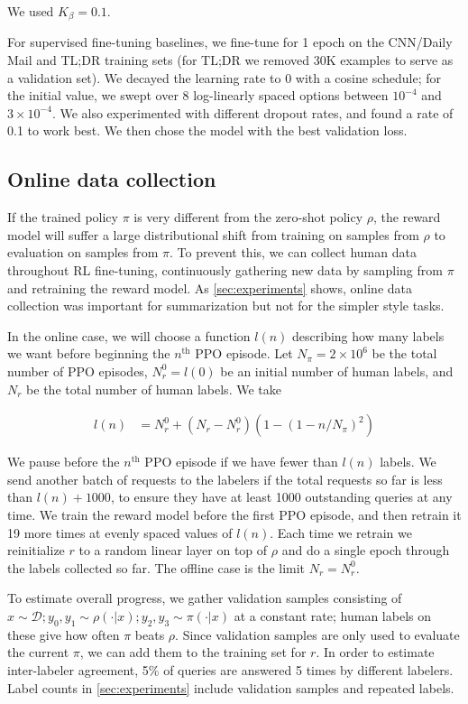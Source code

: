 We used $K_\beta = 0.1$.

For supervised fine-tuning baselines, we fine-tune for 1 epoch on the CNN/Daily Mail and TL;DR training sets (for TL;DR we removed 30K examples to serve as a validation set). We decayed the learning rate to 0 with a cosine schedule; for the initial value, we swept over 8 log-linearly spaced options between $10^{-4}$ and $3 \times 10^{-4}$. We also experimented with different dropout rates, and found a rate of 0.1 to work best.  We then chose the model with the best validation loss.  

\subsection{Online data collection \label{sec:online}}

If the trained policy $\pi$ is very different from the zero-shot policy $\rho$, the reward model will suffer a large distributional shift from training on samples from $\rho$ to evaluation on samples from $\pi$.
To prevent this, we can collect human data throughout RL fine-tuning, continuously gathering new data by sampling from $\pi$ and retraining the reward model. As \ref{sec:experiments} shows, online data collection was important for summarization but not for the simpler style tasks.

In the online case, we will choose a function $l(n)$ describing how many labels we want before beginning the $n^{\textrm{th}}$ PPO episode. Let $N_{\pi} = 2 \times 10^6$ be the total number of PPO episodes, $N_r^0 = l(0)$ be an initial number of human labels, and $N_r$ be the total number of human labels. We take

\begin{align*}
l(n) &= N_r^0 + (N_r - N_r^0) \left(1 - (1 - n/N_\pi)^2\right)
\end{align*}

We pause before the $n^{\textrm{th}}$ PPO episode if we have fewer than $l(n)$ labels. We send another batch of requests to the labelers if the total requests so far is less than $l(n) + 1000$, to ensure they have at least 1000 outstanding queries at any time. We train the reward model before the first PPO episode, and then retrain it 19 more times at evenly spaced values of $l(n)$. Each time we retrain we reinitialize $r$ to a random linear layer on top of $\rho$
and do a single epoch through the labels collected so far. The offline case is the limit $N_r = N_r^0$.

To estimate overall progress, we gather validation samples consisting of $x \sim \mathcal{D}; y_0,y_1 \sim \rho(\cdot |x); y_2,y_3 \sim \pi(\cdot | x)$ at a constant rate; human labels on these give how often $\pi$ beats $\rho$.  Since validation samples are only used to evaluate the current $\pi$, we can add them to the training set for $r$. In order to estimate inter-labeler agreement, 5\% of queries are answered 5 times by different labelers.  Label counts in \ref{sec:experiments} include validation samples and repeated labels.

